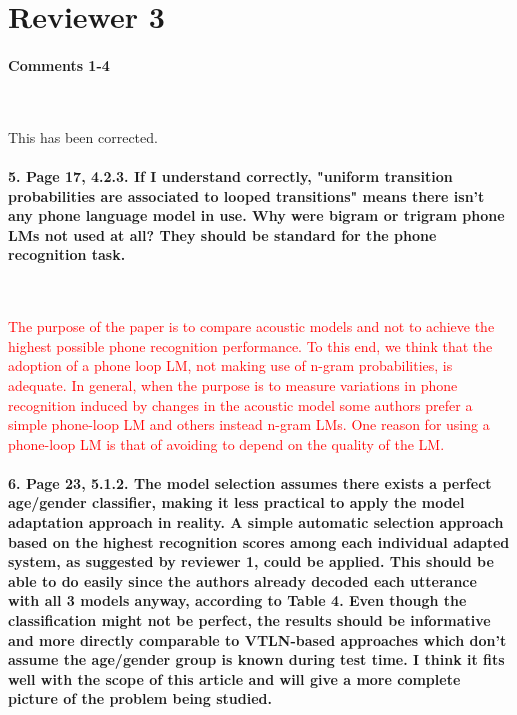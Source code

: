 \documentclass[]{article}
\begin{document}
\section{Reviewer 3}

\paragraph{Comments 1-4}

~

This has been corrected.

\paragraph{5. Page 17, 4.2.3. If I understand correctly, "uniform transition probabilities are associated to looped transitions" means there isn't any phone language model in use. Why were bigram or trigram phone LMs not used at all? They should be standard for the phone recognition task.}

~

\textcolor{red}{The purpose of the paper is to compare acoustic models
  and  not   to  achieve   the  highest  possible   phone  recognition
  performance.  To  this end,  we think that  the adoption of  a phone
  loop LM, not  making use of n-gram probabilities,  is adequate.  In
  general,  when  the  purpose  is  to  measure  variations  in  phone
  recognition induced  by changes in  the acoustic model  some authors
  prefer a  simple phone-loop  LM and others  instead n-gram  LMs. One
  reason for  using a phone-loop LM  is that of avoiding  to depend on
  the quality of the LM.}



\paragraph{6. Page 23, 5.1.2. The model selection assumes there exists a perfect age/gender classifier, making it less practical to apply the model adaptation approach in reality. A simple automatic selection approach based on the highest recognition scores among each individual adapted system, as suggested by reviewer 1, could be applied. This should be able to do easily since the authors already decoded each utterance with all 3 models anyway, according to Table 4. Even though the classification might not be perfect, the results should be informative and more directly comparable to VTLN-based approaches which don't assume the age/gender group is known during test time. I think it fits well with the scope of this article and will give a more complete picture of the problem being studied.}
\end{document}
